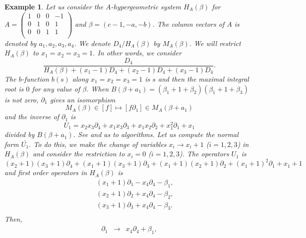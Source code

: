 \documentclass{article}
\def\pd#1{\partial_{#1}}
\newtheorem{example}{Example}
\begin{document}
\begin{example} \rm
Let us consider the $A$-hypergeometric system $H_A(\beta)$ for
$A=\left(\begin{array}{cccc}
 1&0&0& -1 \\
 0&1&0&  1 \\
 0&0&1&  1 \\
\end{array}\right)$
and $\beta=(c-1,-a,-b)$.
The column vectors of $A$ is denoted by $a_1, a_2, a_3, a_4$.
We denote $D_4/H_A(\beta)$ by $M_A(\beta)$.
We will restrict $H_A(\beta)$ to $x_1=x_2=x_3=1$.
In other words, we consider
\begin{equation}
\frac{D_4}{H_A(\beta)+(x_1-1)D_4+(x_2-1)D_4+(x_3-1)D_4}.
\end{equation}
The $b$-function $b(s)$ along $x_1=x_2=x_3=1$ is
$s$ and then the maximal integral root is $0$ for any value of $\beta$.
When $B(\beta+a_1)=(\beta_1+1+\beta_2)(\beta_1+1+\beta_3)$ is not zero,
$\pd{1}$ gives an isomorphism 
\begin{equation} \label{eq:gauss-isom}
M_A(\beta) \in [f] \mapsto [f \pd{1}] \in M_A(\beta+a_1)
\end{equation}
and the inverse of $\pd{1}$ is 
\begin{equation}
U_1 = x_2 x_3 \pd{4} + x_1 x_3 \pd{3} + x_1 x_2 \pd{2} + x_1^2 \pd{1} + x_1
\end{equation}
divided by $B(\beta+a_1)$.
See \cite{SST-ip} and \cite{saito-isom} as to algorithms.
Let us compute the normal form ${\bar {U_1}}$.
To do this, we make the change of variables
$x_i \rightarrow x_i+1$ ($i=1,2,3$) in $H_A(\beta)$ and 
consider the restriction to $x_i=0$ ($i=1,2,3$).
The operators $U_1$ is 
\begin{equation} \label{eq:new_U_1}
 (x_2+1)( x_3+1) \pd{4} + (x_1+1)( x_3+1) \pd{3} 
+(x_1+1)( x_2+1) \pd{2} + (x_1+1)^2 \pd{1} + x_1+1
\end{equation}
and first order operators in $H_A(\beta)$ is
\begin{eqnarray}
&&(x_1+1)\pd{1} - x_4 \pd{4} - \beta_1, \\
&&(x_2+1)\pd{2} + x_4 \pd{4} - \beta_2, \\
&&(x_3+1)\pd{3} + x_4 \pd{4} - \beta_3. \\
\end{eqnarray}
Then,
\begin{eqnarray}
\pd{1} &\rightarrow& x_4 \pd{4} + \beta_1, \\

\end{eqnarray}
\end{example}
\end{document}
